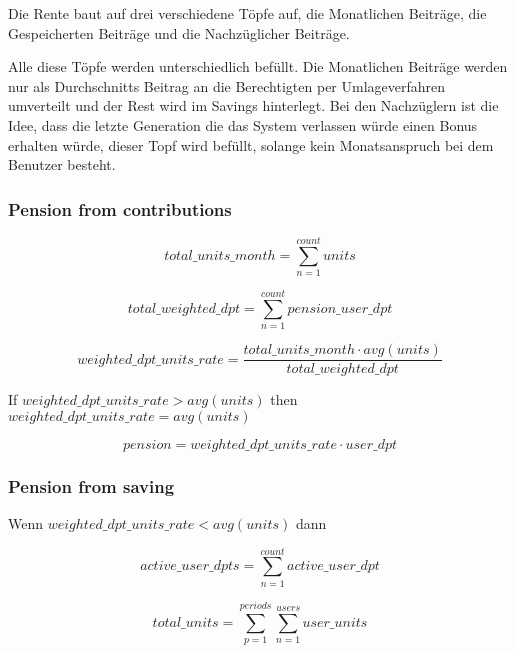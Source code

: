 Die Rente baut auf drei verschiedene Töpfe auf, die Monatlichen Beiträge,
die Gespeicherten Beiträge und die Nachzüglicher Beiträge.

Alle diese Töpfe werden unterschiedlich befüllt.
Die Monatlichen Beiträge werden nur als Durchschnitts Beitrag an die Berechtigten  per Umlageverfahren umverteilt und der Rest wird im Savings hinterlegt.
Bei den Nachzüglern ist die Idee, dass die letzte Generation die das System verlassen würde einen Bonus erhalten würde, dieser Topf wird befüllt,
solange kein Monatsanspruch bei dem Benutzer besteht.

\subsubsection*{Pension from contributions}

\begin{equation*}
	total\_units\_month = 
	\sum_{n=1}^{count} units
\end{equation*}

\begin{equation*}
	total\_weighted\_dpt = 
	\sum_{n=1}^{count} pension\_user\_dpt
\end{equation*}

\begin{equation*}
	weighted\_dpt\_units\_rate = 	
	\frac{total\_units\_month  \cdot avg(units)} 
	{total\_weighted\_dpt}		
\end{equation*}

If $weighted\_dpt\_units\_rate > avg(units)$ then $weighted\_dpt\_units\_rate = avg(units)$
        

\begin{equation*}
	pension = 	
	weighted\_dpt\_units\_rate \cdot user\_dpt
\end{equation*}


\subsubsection*{Pension from saving}

Wenn $weighted\_dpt\_units\_rate < avg(units)$ dann 

\begin{equation*}
	active\_user\_dpts = 
	\sum_{n=1}^{count} active\_user\_dpt
\end{equation*}

\begin{equation*}
	total\_units = 	
	\sum_{p=1}^{periods} \sum_{n=1}^{users} user\_units	
\end{equation*}


